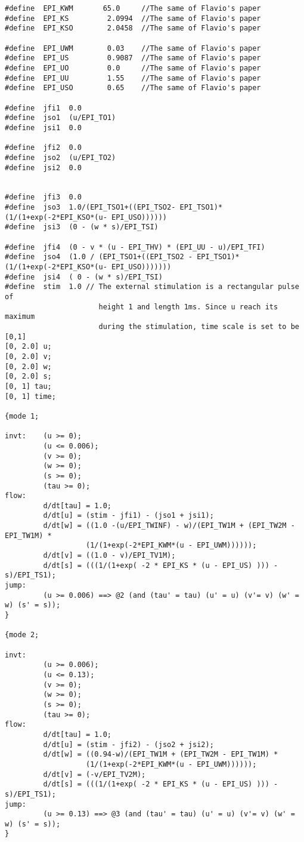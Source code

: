 \begin{verbatim}
#define  EPI_KWM       65.0     //The same of Flavio's paper
#define  EPI_KS         2.0994  //The same of Flavio's paper
#define  EPI_KSO        2.0458  //The same of Flavio's paper

#define  EPI_UWM        0.03    //The same of Flavio's paper
#define  EPI_US         0.9087  //The same of Flavio's paper
#define  EPI_UO         0.0     //The same of Flavio's paper
#define  EPI_UU         1.55    //The same of Flavio's paper
#define  EPI_USO        0.65    //The same of Flavio's paper

#define  jfi1  0.0
#define  jso1  (u/EPI_TO1)
#define  jsi1  0.0

#define  jfi2  0.0
#define  jso2  (u/EPI_TO2)
#define  jsi2  0.0


#define  jfi3  0.0
#define  jso3  1.0/(EPI_TSO1+((EPI_TSO2- EPI_TSO1)*(1/(1+exp(-2*EPI_KSO*(u- EPI_USO))))))
#define  jsi3  (0 - (w * s)/EPI_TSI)

#define  jfi4  (0 - v * (u - EPI_THV) * (EPI_UU - u)/EPI_TFI)
#define  jso4  (1.0 / (EPI_TSO1+((EPI_TSO2 - EPI_TSO1)*(1/(1+exp(-2*EPI_KSO*(u- EPI_USO)))))))
#define  jsi4  ( 0 - (w * s)/EPI_TSI)
#define	 stim  1.0 // The external stimulation is a rectangular pulse of 
                      height 1 and length 1ms. Since u reach its maximum 
                      during the stimulation, time scale is set to be [0,1] 
[0, 2.0] u;
[0, 2.0] v;
[0, 2.0] w;
[0, 2.0] s;
[0, 1] tau;
[0, 1] time;

{mode 1;

invt:    (u >= 0);
         (u <= 0.006);
         (v >= 0);
         (w >= 0);
         (s >= 0);
         (tau >= 0);
flow:
         d/dt[tau] = 1.0;
         d/dt[u] = (stim - jfi1) - (jso1 + jsi1);
         d/dt[w] = ((1.0 -(u/EPI_TWINF) - w)/(EPI_TW1M + (EPI_TW2M - EPI_TW1M) * 
                   (1/(1+exp(-2*EPI_KWM*(u - EPI_UWM))))));
         d/dt[v] = ((1.0 - v)/EPI_TV1M);
         d/dt[s] = (((1/(1+exp( -2 * EPI_KS * (u - EPI_US) ))) - s)/EPI_TS1);
jump:
         (u >= 0.006) ==> @2 (and (tau' = tau) (u' = u) (v'= v) (w' = w) (s' = s));
}

{mode 2;

invt:
         (u >= 0.006);
         (u <= 0.13);
         (v >= 0);
         (w >= 0);
         (s >= 0);
         (tau >= 0);
flow:
         d/dt[tau] = 1.0;
         d/dt[u] = (stim - jfi2) - (jso2 + jsi2);
         d/dt[w] = ((0.94-w)/(EPI_TW1M + (EPI_TW2M - EPI_TW1M) * 
                   (1/(1+exp(-2*EPI_KWM*(u - EPI_UWM))))));
         d/dt[v] = (-v/EPI_TV2M);
         d/dt[s] = (((1/(1+exp( -2 * EPI_KS * (u - EPI_US) ))) - s)/EPI_TS1);
jump:
         (u >= 0.13) ==> @3 (and (tau' = tau) (u' = u) (v'= v) (w' = w) (s' = s));
}


\end{verbatim}
